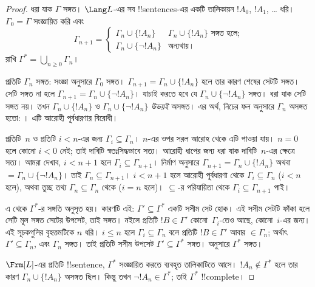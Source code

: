 \documentclass[../../../include/open-logic-section]{subfiles}
\begin{document}
\begin{proof}
ধরা যাক $\Gamma$ সঙ্গত। $\Lang L$-এর সব !!{sentence}s-এর একটি তালিকায়ন
$!A_0$, $!A_1$, \dots{} ধরি। $\Gamma_0 = \Gamma$ সংজ্ঞায়িত করি এবং
\[
\Gamma_{n+1} =
\begin{cases}
\Gamma_n \cup \{ !A_n \} & \textrm{$\Gamma_n \cup \{!A_n\}$ সঙ্গত হলে;} \\
\Gamma_n \cup \{ \lnot !A_n \} & \textrm{অন্যথায়।}
\end{cases}
\]
রাখি $\Gamma^* = \bigcup_{n \geq 0} \Gamma_n$।

প্রতিটি $\Gamma_n$ সঙ্গত: সংজ্ঞা অনুসারে $\Gamma_0$ সঙ্গত।
$\Gamma_{n+1} = \Gamma_n \cup \{!A_n\}$ হলে তার কারণ শেষের সেটটি সঙ্গত।
সেটি সঙ্গত না হলে $\Gamma_{n+1} = \Gamma_n \cup \{\lnot !A_n\}$। যাচাই
করতে হবে যে $\Gamma_n \cup \{\lnot !A_n\}$ সঙ্গত। ধরা যাক সেটি সঙ্গত
নয়। তখন $\Gamma_n \cup \{!A_n\}$ ও $\Gamma_n \cup \{\lnot !A_n\}$
\emph{উভয়ই} অসঙ্গত। এর অর্থ, নিচের ফল অনুসারে $\Gamma_n$ অসঙ্গত হতো:
।
এটি আরোহী পূর্বধারণার বিরোধী।

প্রতিটি~$n$ ও প্রতিটি $i < n$-এর জন্য $\Gamma_i \subseteq \Gamma_n$।
$n$-এর ওপর সরল আরোহ থেকে এটি পাওয়া যায়। $n=0$ হলে কোনো $i < 0$ নেই;
তাই দাবিটি স্বতঃসিদ্ধভাবে সত্য। আরোহী ধাপের জন্য ধরা যাক দাবিটি~$n$-এর
ক্ষেত্রে সত্য। আমরা দেখাব, $i < n+1$ হলে $\Gamma_i \subseteq
\Gamma_{n+1}$। নির্মাণ অনুসারে $\Gamma_{n+1} = \Gamma_n \cup \{!A_n\}$
অথবা $= \Gamma_n \cup \{\lnot !A_n\}$। তাই $\Gamma_n \subseteq
\Gamma_{n+1}$। $i < n+1$ হলে আরোহী পূর্বধারণা থেকে $\Gamma_i \subseteq
\Gamma_n$ ($i < n$ হলে), অথবা তুচ্ছ তথ্য $\Gamma_n \subseteq \Gamma_n$
থেকে ($i = n$ হলে)। $\subseteq$-র পরিযায়িতা থেকে $\Gamma_i \subseteq
\Gamma_{n+1}$ পাই।

এ থেকে $\Gamma^*$-র সঙ্গতি অনুসৃত হয়। কারণটি এই: $\Gamma' \subseteq
\Gamma^*$ একটি সসীম সেট হোক। এই সসীম সেটটি ফাঁকা হলে সেটি মূল সঙ্গত
সেটের উপসেট, তাই সঙ্গত।
নইলে প্রতিটি $!B \in \Gamma'$ কোনো~$\Gamma_i$-তেও আছে, কোনো~$i$-এর
জন্য। এই সূচকগুলির বৃহত্তমটিকে $n$ ধরি। $i \le n$ হলে
$\Gamma_i \subseteq \Gamma_n$ বলে প্রতিটি $!B \in \Gamma'$ আবার
$\in \Gamma_n$; অর্থাৎ $\Gamma' \subseteq \Gamma_n$, এবং
$\Gamma_n$ সঙ্গত। তাই প্রতিটি সসীম উপসেট $\Gamma' \subseteq \Gamma^*$
সঙ্গত।
অনুসারে $\Gamma^*$ সঙ্গত।

$\Frm[L]$-এর প্রতিটি !!{sentence}, $\Gamma^*$ সংজ্ঞায়িত করতে ব্যবহৃত
তালিকাটিতে আসে। $!A_n \notin \Gamma^*$ হলে তার কারণ $\Gamma_n \cup
\{!A_n\}$ অসঙ্গত ছিল। কিন্তু তখন $\lnot !A_n \in \Gamma^*$; তাই
$\Gamma^*$ !!{complete}।
\end{proof}
\end{document}
